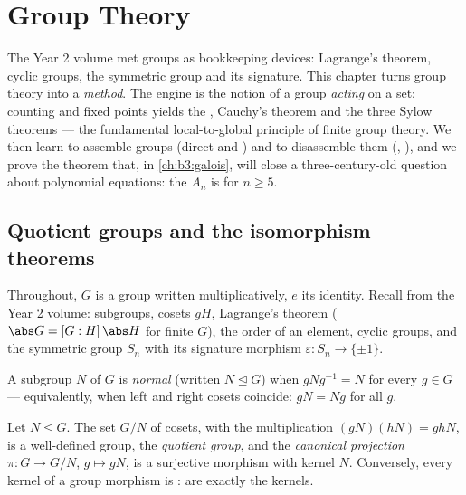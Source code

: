 \chapter{Group Theory}\label{ch:b3:groups}

The Year 2 volume met groups as bookkeeping devices: Lagrange's
theorem, cyclic groups, the symmetric group and its signature. This
chapter turns group theory into a \emph{method}. The engine is the
notion of a group \emph{acting} on a set: counting  and fixed
points yields the , Cauchy's theorem and the three
Sylow theorems --- the fundamental local-to-global principle of
finite group theory. We then learn to assemble groups (direct and
) and to disassemble them (,
), and we prove the theorem that, in
\cref{ch:b3:galois}, will close a three-century-old question about
polynomial equations: the  $A_n$ is  for $n
\geq 5$.

\section{Quotient groups and the isomorphism theorems}

Throughout, $G$ is a group written multiplicatively, $e$ its
identity. Recall from the Year 2 volume: subgroups, cosets $gH$,
Lagrange's theorem ($\abs G = [G:H]\,\abs H$ for finite $G$), the
order of an element, cyclic groups, and the symmetric group $S_n$
with its signature morphism $\varepsilon \colon S_n \to \{\pm1\}$.

\begin{definition}\label{def:b3:groups:normal}
A subgroup $N$ of $G$ is \emph{normal}
(written $N \trianglelefteq G$) when $gNg^{-1} = N$ for every $g
\in G$ --- equivalently, when left and right cosets coincide: $gN =
Ng$ for all $g$.
\end{definition}

\begin{theorem}\label{thm:b3:groups:quotient}
Let $N \trianglelefteq G$. The set $G/N$ of cosets, with the
multiplication $(gN)(hN) = ghN$, is a well-defined group, the
\emph{quotient group}, and the
\emph{canonical projection} $\pi \colon G \to G/N$, $g \mapsto gN$,
is a surjective morphism with kernel $N$. Conversely, every kernel
of a group morphism is :  are exactly the
kernels.
\end{theorem}

